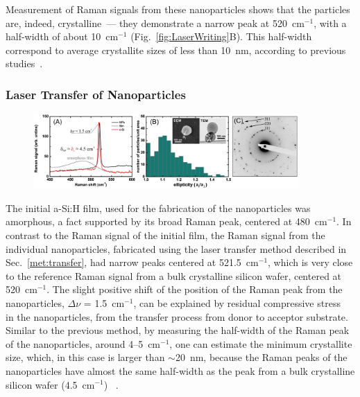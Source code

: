                 Measurement of Raman signals from these nanoparticles shows that the particles are, indeed, crystalline~---  they demonstrate
            a narrow peak at 520~cm$^{-1}$, with a half-width of about 10~cm$^{-1}$ (Fig.~\ref{fig:LaserWriting}B).
            This half-width correspond to average crystallite sizes of less than 10~nm, according to previous studies~\cite{campbell1986effects}.

        \subsubsection{Laser Transfer of Nanoparticles}
            \begin{figure}[!ht]
                    \begin{center}
                        \includegraphics[width=0.9\textwidth]{figs/results/fab/Crystallinity.eps}
                    \end{center}
                    \caption{}
                    \label{fig:Crystallinity}
            \end{figure}


                The initial a-Si:H film, used for the fabrication of the nanoparticles was amorphous, a fact supported by its broad Raman peak,
            centered at 480~cm$^{-1}$. In contrast to the Raman signal of the initial film, the Raman signal from the individual nanoparticles,
            fabricated using the laser transfer method described in Sec.~\ref{met:transfer}, had narrow peaks centered at 521.5~cm$^{-1}$, which
            is very close to the reference Raman signal from a bulk crystalline silicon wafer, centered at 520~cm$^{-1}$. The slight positive shift
            of the position of the Raman peak from the nanoparticles, $\Delta$$\nu$ = 1.5~cm$^{-1}$, can be explained by residual compressive stress
            ~\cite{de1996micro} in the nanoparticles, from the transfer process from donor to acceptor substrate. Similar to the previous method,
            by measuring the half-width of the Raman peak of the nanoparticles, around 4--5~cm$^{-1}$, one can estimate the minimum crystallite size,
            which, in this case is larger than $\sim$20~nm, because the Raman peaks of the nanoparticles have
            almost the same half-width as the peak from a bulk crystalline silicon wafer (4.5~cm$^{-1}$) ~\cite{campbell1986effects}.

